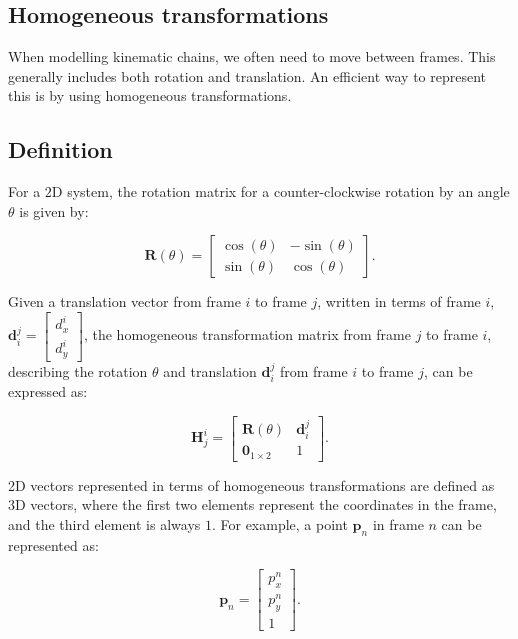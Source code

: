 \subsection{Homogeneous transformations}%
\label{subsec:theory_modelling_homogeneous_transformations}

When modelling kinematic chains, we often need to move between frames. This generally includes both rotation and translation. An efficient way to represent this is by using homogeneous transformations. 

\subsection*{Definition}
For a $2$D system, the rotation matrix for a counter-clockwise rotation by an angle $\theta$ is given by:

\begin{equation}
    \mathbf{R}(\theta) = \begin{bmatrix}
        \cos(\theta) & -\sin(\theta) \\
        \sin(\theta) & \cos(\theta)
    \end{bmatrix}.
\end{equation}

Given a translation vector from frame $i$ to frame $j$, written in terms of frame $i$, $\mathbf{d}_i^j = \begin{bmatrix}
    d_x^i \\
    d_y^i
\end{bmatrix}$, the homogeneous transformation matrix from frame $j$ to frame $i$, describing the rotation $\theta$ and translation $\mathbf{d}_i^j$ from frame $i$ to frame $j$, can be expressed as:

\begin{equation}
    \label{eq:theory_homogeneous_transformation}
    \mathbf{H}_j^i = \begin{bmatrix}
        \mathbf{R}(\theta) & \mathbf{d}_i^j \\
        \mathbf{0}_{1 \times 2} & 1
    \end{bmatrix}.
\end{equation}

2D vectors represented in terms of homogeneous transformations are defined as 3D vectors, where the first two elements represent the coordinates in the frame, and the third element is always $1$. For example, a point $\mathbf{p}_n$ in frame $n$ can be represented as:

\begin{equation}
    \mathbf{p}_n = \begin{bmatrix}
        p_x^n \\
        p_y^n \\
        1
    \end{bmatrix}.
\end{equation}

